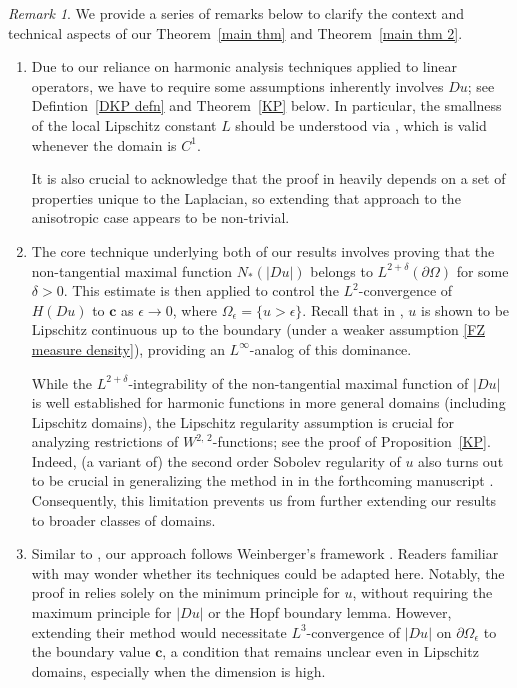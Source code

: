 \documentclass[reqno,11pt]{amsart}
\makeatletter
\def\ez{\epsilon}
\numberwithin{equation}{section}
\theoremstyle{remark}
\newtheorem{rem}[thm]{Remark}%
\makeatother
\begin{document}
\begin{rem} We provide a series of remarks below to clarify the context and technical aspects of our  Theorem~\ref{main thm} and Theorem~\ref{main thm 2}.
\noindent\begin{enumerate}
\item Due to our reliance on harmonic analysis techniques applied to linear operators, we have to require some assumptions inherently involves $Du$; see Defintion~\ref{DKP defn} and Theorem~\ref{KP} below. In particular, the smallness of the local Lipschitz constant $L$ should be understood via \cite[Definition 2.2]{DPR2017}, which is valid whenever the domain is $C^1$. 


It is also crucial to acknowledge that the proof in \cite{FZ2025} heavily depends on a set of properties unique to the Laplacian, so extending that approach to the anisotropic case appears to be non-trivial.


\item The core technique underlying both of our results involves proving that the non-tangential maximal function $N_*(|Du|)$ belongs to $L^{2+\delta}(\partial\Omega)$ for some $\delta>0$. This estimate is then applied to control the  $L^2$-convergence of %
$H(Du)$ to $\mathbf {c}$ as $\ez\to 0$, where $\Omega_\ez=\{u>\ez\}$. Recall that in \cite{FZ2025}, $u$ is shown to be Lipschitz continuous up to the boundary (under a weaker assumption \eqref{FZ measure density}), providing an $L^\infty$-analog of this dominance.  

While the $L^{2+\delta}$-integrability of the non-tangential maximal function of $|Du|$ is well established for harmonic functions in more general domains (including Lipschitz domains), the Lipschitz regularity assumption is crucial for analyzing restrictions of  $W^{2,\,2}$-functions; see the proof of Proposition~\ref{KP}. Indeed, (a variant of) the second order Sobolev regularity of $u$ also turns out  to be crucial in generalizing the method in \cite{FZ2025} in the forthcoming manuscript \cite{FZ2026}. 
Consequently, this limitation prevents us from further extending our results to broader classes of domains.
 


\item Similar to \cite{FZ2025}, our approach follows Weinberger's framework \cite{W1971}. Readers familiar with \cite{BNST2008} may wonder whether its techniques could be adapted here. Notably, the proof in \cite{BNST2008} relies solely on the minimum principle for $u$, without requiring the maximum principle for $|Du|$ or the Hopf boundary lemma. However, extending their method would necessitate $L^3$-convergence of $|Du|$ on $\partial\Omega_{\ez}$   to the boundary value $\mathbf {c}$, a condition that remains unclear even in Lipschitz domains, especially when the dimension is high.
\end{enumerate}
\end{rem}
\end{document}
